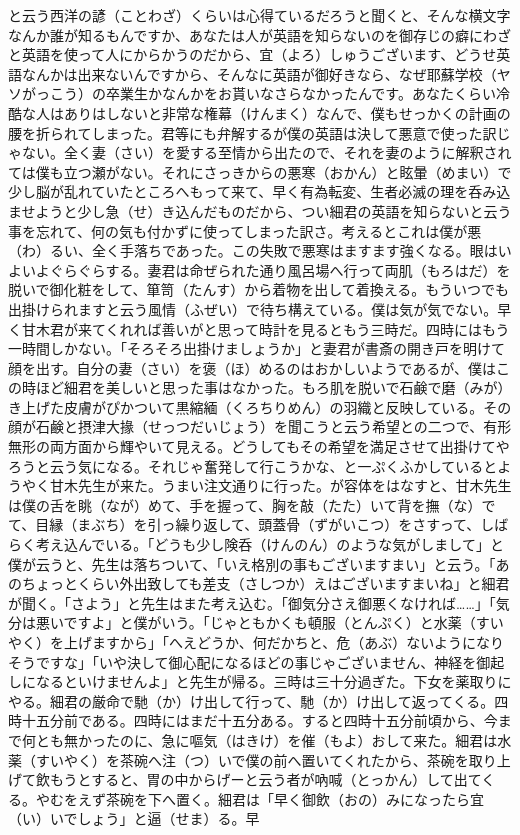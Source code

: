 \documentclass{book}
\begin{document}
と云う西洋の諺（ことわざ）くらいは心得ているだろうと聞くと、そんな横文字なんか誰が知るもんですか、あなたは人が英語を知らないのを御存じの癖にわざと英語を使って人にからかうのだから、宜（よろ）しゅうございます、どうせ英語なんかは出来ないんですから、そんなに英語が御好きなら、なぜ耶蘇学校（ヤソがっこう）の卒業生かなんかをお貰いなさらなかったんです。あなたくらい冷酷な人はありはしないと非常な権幕（けんまく）なんで、僕もせっかくの計画の腰を折られてしまった。君等にも弁解するが僕の英語は決して悪意で使った訳じゃない。全く妻（さい）を愛する至情から出たので、それを妻のように解釈されては僕も立つ瀬がない。それにさっきからの悪寒（おかん）と眩暈（めまい）で少し脳が乱れていたところへもって来て、早く有為転変、生者必滅の理を呑み込ませようと少し急（せ）き込んだものだから、つい細君の英語を知らないと云う事を忘れて、何の気も付かずに使ってしまった訳さ。考えるとこれは僕が悪（わ）るい、全く手落ちであった。この失敗で悪寒はますます強くなる。眼はいよいよぐらぐらする。妻君は命ぜられた通り風呂場へ行って両肌（もろはだ）を脱いで御化粧をして、箪笥（たんす）から着物を出して着換える。もういつでも出掛けられますと云う風情（ふぜい）で待ち構えている。僕は気が気でない。早く甘木君が来てくれれば善いがと思って時計を見るともう三時だ。四時にはもう一時間しかない。「そろそろ出掛けましょうか」と妻君が書斎の開き戸を明けて顔を出す。自分の妻（さい）を褒（ほ）めるのはおかしいようであるが、僕はこの時ほど細君を美しいと思った事はなかった。もろ肌を脱いで石鹸で磨（みが）き上げた皮膚がぴかついて黒縮緬（くろちりめん）の羽織と反映している。その顔が石鹸と摂津大掾（せっつだいじょう）を聞こうと云う希望との二つで、有形無形の両方面から輝やいて見える。どうしてもその希望を満足させて出掛けてやろうと云う気になる。それじゃ奮発して行こうかな、と一ぷくふかしているとようやく甘木先生が来た。うまい注文通りに行った。が容体をはなすと、甘木先生は僕の舌を眺（なが）めて、手を握って、胸を敲（たた）いて背を撫（な）でて、目縁（まぶち）を引っ繰り返して、頭蓋骨（ずがいこつ）をさすって、しばらく考え込んでいる。「どうも少し険呑（けんのん）のような気がしまして」と僕が云うと、先生は落ちついて、「いえ格別の事もございますまい」と云う。「あのちょっとくらい外出致しても差支（さしつか）えはございますまいね」と細君が聞く。「さよう」と先生はまた考え込む。「御気分さえ御悪くなければ\ldots{}\ldots{}」「気分は悪いですよ」と僕がいう。「じゃともかくも頓服（とんぷく）と水薬（すいやく）を上げますから」「へえどうか、何だかちと、危（あぶ）ないようになりそうですな」「いや決して御心配になるほどの事じゃございません、神経を御起しになるといけませんよ」と先生が帰る。三時は三十分過ぎた。下女を薬取りにやる。細君の厳命で馳（か）け出して行って、馳（か）け出して返ってくる。四時十五分前である。四時にはまだ十五分ある。すると四時十五分前頃から、今まで何とも無かったのに、急に嘔気（はきけ）を催（もよ）おして来た。細君は水薬（すいやく）を茶碗へ注（つ）いで僕の前へ置いてくれたから、茶碗を取り上げて飲もうとすると、胃の中からげーと云う者が吶喊（とっかん）して出てくる。やむをえず茶碗を下へ置く。細君は「早く御飲（おの）みになったら宜（い）いでしょう」と逼（せま）る。早
\end{document}
